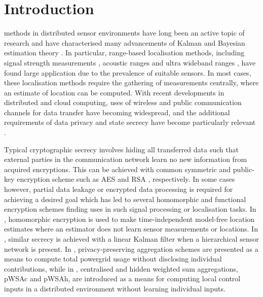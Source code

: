 \documentclass[10pt,letterpaper,oneside,twocolumn,journal]{IEEEtran}
\theoremstyle{definition}
\theoremstyle{definition}
\theoremstyle{remark}
\begin{document}
\section{Introduction} \label{sec:introduction}
 methods in distributed sensor environments have long been an active topic of research \cite{pierceIntroductionLoran1946,ligginsDistributedDataFusion2012,liContributedReviewSourcelocalization2016} and have characterised many advancements of Kalman and Bayesian estimation theory \cite{mutambaraDecentralizedEstimationControl1998}. In particular, range-based localisation methods, including signal strength measurements \cite{wangConvexCombinationSource2018,heRangeFreeLocalizationSchemes2003}, acoustic ranges \cite{beutlerNewNonlinearFiltering2004} and ultra wideband ranges \cite{geziciLocalizationUltraWidebandRadios2005}, have found large application due to the prevalence of suitable sensors. In most cases, these localisation methods require the gathering of measurements centrally, where an estimate of location can be computed. With recent developments in distributed and cloud computing, uses of wireless and public communication channels for data transfer have becoming widespread, and the additional requirements of data privacy and state secrecy have become particularly relevant \cite{brennerSecretProgramExecution2011,renSecurityChallengesPublic2012}.

Typical cryptographic secrecy involves hiding all transferred data such that external parties in the communication network learn no new information from acquired encryptions. This can be achieved with common symmetric and public-key encryption scheme such as AES \cite{gueronIntelAdvancedEncryption2010} and RSA \cite{rivestMethodObtainingDigital1978}, respectively. In some cases however, partial data leakage or encrypted data processing is required for achieving a desired goal which has led to several homomorphic and functional encryption schemes \cite{paillierPublicKeyCryptosystemsBased1999,shiPrivacyPreservingAggregationTimeSeries2011,joyeScalableSchemePrivacyPreserving2013,chotardDecentralizedMultiClientFunctional2018} finding uses in such signal processing or localisation tasks. In \cite{alanwarPrOLocResilientLocalization2017}, homomorphic encryption is used to make time-independent model-free location estimates where an estimator does not learn sensor measurements or locations. In \cite{aristovEncryptedMultisensorInformation2018}, similar secrecy is achieved with a linear Kalman filter when a hierarchical sensor network is present. In \cite{shiPrivacyPreservingAggregationTimeSeries2011,joyeScalableSchemePrivacyPreserving2013}, privacy-preserving aggregation schemes are presented as a means to compute total powergrid usage without disclosing individual contributions, while in \cite{alexandruEncryptedCooperativeControl2019,alexandruPrivateWeightedSum2020}, centralised and hidden weighted sum aggregations, pWSAc and pWSAh, are introduced as a means for computing local control inputs in a distributed environment without learning individual inputs.
\end{document}
